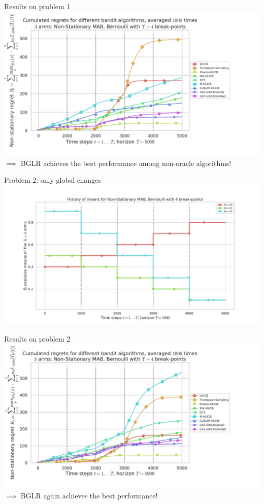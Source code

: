 \documentclass[11pt,english,ignorenonframetext,]{beamer}
\begin{document}
\begin{frame}[plain]{Results on problem 1}
  \centering
  \includegraphics[width=1.15\textwidth]{figures/regret_problem1.png}
  $\implies$ BGLR achieves the best performance among non-oracle algorithms!
\end{frame}


\begin{frame}[plain]{Problem 2: only global changes}
  \centering
  \includegraphics[width=1.00\textwidth]{figures/Problem_2.pdf}
\end{frame}

\begin{frame}[plain]{Results on problem 2}
  \centering
  \includegraphics[width=1.15\textwidth]{figures/regret_problem2.pdf}
  $\implies$ BGLR again achieves the best performance!
\end{frame}
\end{document}
